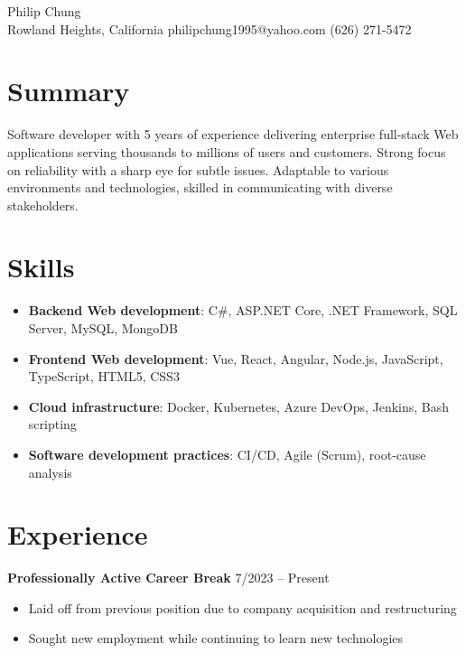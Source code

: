 \documentclass[12pt]{article}
\newcommand{\primaryheader}[4]{
	\textbf{#1}
	\ifthenelse{\equal{#3}{}}{}{%
		\symbol{"B7} #3 \ifthenelse{\equal{#4}{}}{}{(#4)}
	}
	\hfill #2
}
\begin{document}
	\begin{center}
		{\headerfont\fontsize{24pt}{24pt}\selectfont Philip Chung} \\ \vspace{0.5em}
		Rowland Heights, California  philipchung1995@yahoo.com  (626) 271-5472
	\end{center}

	\section*{Summary}

	Software developer with 5 years of experience delivering enterprise full-stack Web applications serving thousands to millions of users and customers. Strong focus on reliability with a sharp eye for subtle issues. Adaptable to various environments and technologies, skilled in communicating with diverse stakeholders.

	\section*{Skills}

	\newcommand{\skillitem}[2]{\item \textbf{#1}: #2}

	\begin{itemize}[left=0.25in .. 0.25in,label={},itemindent=-0.25in]
		\skillitem{Backend Web development}{C\#, ASP.NET Core, .NET Framework, SQL Server, MySQL, MongoDB}
		\skillitem{Frontend Web development}{Vue, React, Angular, Node.js, JavaScript, TypeScript, HTML5, CSS3}
		\skillitem{Cloud infrastructure}{Docker, Kubernetes, Azure DevOps, Jenkins, Bash scripting}
		\skillitem{Software development practices}{CI/CD, Agile (Scrum), root-cause analysis}
	\end{itemize}

	\section*{Experience}

	\primaryheader{Professionally Active Career Break}{7/2023 -- Present}{}{}

	\begin{itemize}
		\item Laid off from previous position due to company acquisition and restructuring
		\item Sought new employment while continuing to learn new technologies
	\end{itemize}
\end{document}
